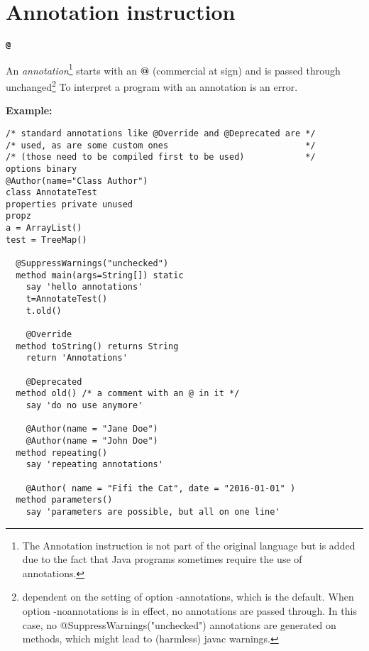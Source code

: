 \section{Annotation instruction}\label{refparse}
\begin{shaded}
\begin{alltt}
\textbf{@}
\end{alltt}
\end{shaded}
An \emph{annotation}\footnote{The Annotation instruction is not part of
the original \nr{} language but is added due to the fact that Java
programs sometimes require the use of annotations.} starts with an \textbf{@} (commercial at sign)
and is passed through unchanged\footnote{dependent on the setting of
option -annotations, which is the default. When option -noannotations
is in effect, no annotations are passed through. In this case, no
@SuppressWarnings("unchecked") annotations are generated on methods,
which might lead to (harmless) javac warnings. } To interpret a program with an annotation is an error.

\textbf{Example:}
\begin{lstlisting}
/* standard annotations like @Override and @Deprecated are */
/* used, as are some custom ones                           */
/* (those need to be compiled first to be used)            */
options binary
@Author(name="Class Author")
class AnnotateTest
properties private unused
propz
a = ArrayList()
test = TreeMap()

  @SuppressWarnings("unchecked")
  method main(args=String[]) static
    say 'hello annotations'
    t=AnnotateTest()
    t.old()

    @Override
  method toString() returns String
    return 'Annotations'

    @Deprecated
  method old() /* a comment with an @ in it */
    say 'do no use anymore'

    @Author(name = "Jane Doe")
    @Author(name = "John Doe")
  method repeating()
    say 'repeating annotations'

    @Author( name = "Fifi the Cat", date = "2016-01-01" )
  method parameters()
    say 'parameters are possible, but all on one line'
\end{lstlisting}
